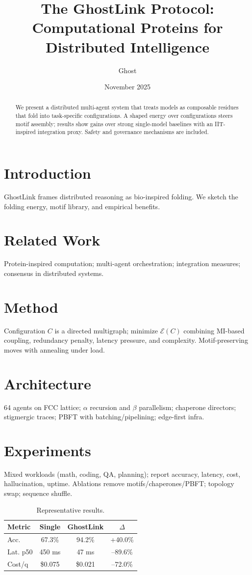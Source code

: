 \documentclass[10pt,twocolumn]{article}
\title{The GhostLink Protocol: Computational Proteins for Distributed Intelligence}
\author{Ghost}
\date{November 2025}
\begin{document}
\maketitle
\begin{abstract}
We present a distributed multi-agent system that treats models as composable residues that fold into task-specific configurations. A shaped energy over configurations steers motif assembly; results show gains over strong single-model baselines with an IIT-inspired integration proxy. Safety and governance mechanisms are included.
\end{abstract}
\section{Introduction}
GhostLink frames distributed reasoning as bio-inspired folding. We sketch the folding energy, motif library, and empirical benefits.
\section{Related Work}
Protein-inspired computation; multi-agent orchestration; integration measures; consensus in distributed systems.
\section{Method}
Configuration $C$ is a directed multigraph; minimize $\mathcal{E}(C)$ combining MI-based coupling, redundancy penalty, latency pressure, and complexity. Motif-preserving moves with annealing under load.
\section{Architecture}
64 agents on FCC lattice; $\alpha$ recursion and $\beta$ parallelism; chaperone directors; stigmergic traces; PBFT with batching/pipelining; edge-first infra.
\section{Experiments}
Mixed workloads (math, coding, QA, planning); report accuracy, latency, cost, hallucination, uptime. Ablations remove motifs/chaperones/PBFT; topology swap; sequence shuffle.
\begin{table}[h]
\centering
\begin{tabular}{@{}lccc@{}}\toprule
Metric & Single & GhostLink & $\Delta$\\\midrule
Acc. & 67.3\% & 94.2\% & +40.0\%\\
Lat. p50 & 450 ms & 47 ms & --89.6\%\\
Cost/q & \$0.075 & \$0.021 & --72.0\%\\
\bottomrule\end{tabular}
\caption{Representative results.}
\end{table}
\end{document}
